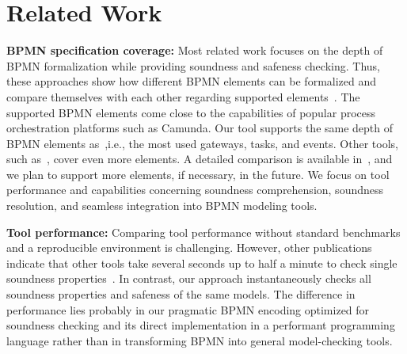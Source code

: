 \documentclass[runningheads]{llncs}
\begin{document}
\section{Related Work} \label{sec:related-work}

\textbf{BPMN specification coverage:}
Most related work focuses on the depth of BPMN formalization while providing soundness and safeness checking.
Thus, these approaches show how different BPMN elements can be formalized and compare themselves with each other regarding supported elements~\cite{corradiniFormalApproachAnalysis2021,houhouFirstOrderLogicVerification2022,krauterFormalizationAnalysisBPMN2023,krauterHigherorderTransformationApproach2023}.
The supported BPMN elements come close to the capabilities of popular process orchestration platforms such as Camunda.
Our tool supports the same depth of BPMN elements as~\cite{corradiniFormalApproachAnalysis2021},i.e., the most used gateways, tasks, and events.
Other tools, such as~\cite{krauterHigherorderTransformationApproach2023}, cover even more elements.
A detailed comparison is available in~\cite{noauthorgivenBPM2024Artifacts2024}, and we plan to support more elements, if necessary, in the future.
We focus on tool performance and capabilities concerning soundness comprehension, soundness resolution, and seamless integration into BPMN modeling tools.

\textbf{Tool performance:}
Comparing tool performance without standard benchmarks and a reproducible environment is challenging.
However, other publications indicate that other tools take several seconds up to half a minute to check single soundness properties~\cite{corradiniFormalApproachAnalysis2021,houhouFirstOrderLogicVerification2022,krauterHigherorderTransformationApproach2023}.
In contrast, our approach instantaneously checks all soundness properties and safeness of the same models.
The difference in performance lies probably in our pragmatic BPMN encoding optimized for soundness checking and its direct implementation in a performant programming language rather than in transforming BPMN into general model-checking tools.
\end{document}
